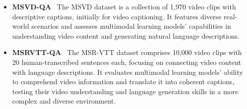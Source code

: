 \begin{itemize}[leftmargin=10pt]
\item \textbf{MSVD-QA}~\cite{xu2017video}
The MSVD dataset is a collection of 1,970 video clips with descriptive captions, initially for video captioning. It features diverse real-world scenarios and assesses multimodal learning models' capabilities in understanding video content and generating natural language descriptions.

\item \textbf{MSRVTT-QA}~\cite{xu2017video}
The MSR-VTT dataset comprises 10,000 video clips with 20 human-transcribed sentences each, focusing on connecting video content with language descriptions. It evaluates multimodal learning models' ability to comprehend video information and translate it into coherent captions, testing their video understanding and language generation skills in a more complex and diverse environment.
\end{itemize}



